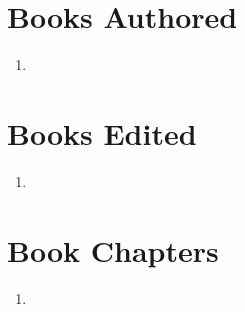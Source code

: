 \section*{Books Authored}

\begin{enumerate}
    \item {}
\end{enumerate}

\section*{Books Edited}

\begin{enumerate}
    \item {}
\end{enumerate}

\section*{Book Chapters}

\begin{enumerate}
    \item {}
\end{enumerate}

